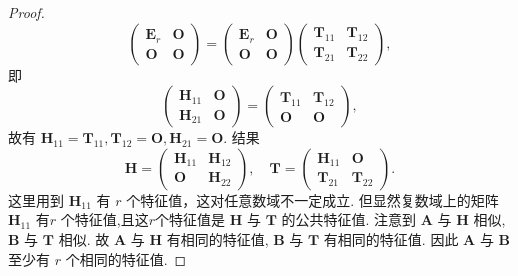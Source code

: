 \documentclass[../../main.tex]{subfiles}
\begin{document}
\begin{proof}
\[\begin{pmatrix}
\boldsymbol{E}_r & \boldsymbol{O} \\
\boldsymbol{O} & \boldsymbol{O} 
\end{pmatrix} = \begin{pmatrix} 
\boldsymbol{E}_r & \boldsymbol{O} \\
\boldsymbol{O} & \boldsymbol{O} 
\end{pmatrix} \begin{pmatrix} 
\boldsymbol{T}_{11} & \boldsymbol{T}_{12} \\
\boldsymbol{T}_{21} & \boldsymbol{T}_{22} 
\end{pmatrix},
\]
即
\[
\begin{pmatrix} 
\boldsymbol{H}_{11} & \boldsymbol{O} \\
\boldsymbol{H}_{21} & \boldsymbol{O} 
\end{pmatrix} = \begin{pmatrix} 
\boldsymbol{T}_{11} & \boldsymbol{T}_{12} \\
\boldsymbol{O} & \boldsymbol{O} 
\end{pmatrix},
\]
故有 $\boldsymbol{H}_{11} = \boldsymbol{T}_{11}, \boldsymbol{T}_{12} = \boldsymbol{O}, \boldsymbol{H}_{21} = \boldsymbol{O}$. 结果
\[
\boldsymbol{H} = \begin{pmatrix} 
\boldsymbol{H}_{11} & \boldsymbol{H}_{12} \\
\boldsymbol{O} & \boldsymbol{H}_{22} 
\end{pmatrix}, \quad \boldsymbol{T} = \begin{pmatrix} 
\boldsymbol{H}_{11} & \boldsymbol{O} \\
\boldsymbol{T}_{21} & \boldsymbol{T}_{22} 
\end{pmatrix}.
\]
这里用到 $\boldsymbol{H}_{11}$ 有 $r$ 个特征值，这对任意数域不一定成立. 但显然复数域上的矩阵 $\boldsymbol{H}_{11}$ 有$r$ 个特征值,且这$r$个特征值是 $\boldsymbol{H}$ 与 $\boldsymbol{T}$ 的公共特征值. 注意到 $\boldsymbol{A}$ 与 $\boldsymbol{H}$ 相似, $\boldsymbol{B}$ 与 $\boldsymbol{T}$ 相似. 故 $\boldsymbol{A}$ 与 $\boldsymbol{H}$ 有相同的特征值, $\boldsymbol{B}$ 与 $\boldsymbol{T}$ 有相同的特征值. 因此 $\boldsymbol{A}$ 与 $\boldsymbol{B}$ 至少有 $r$ 个相同的特征值.
\end{proof}
\end{document}
